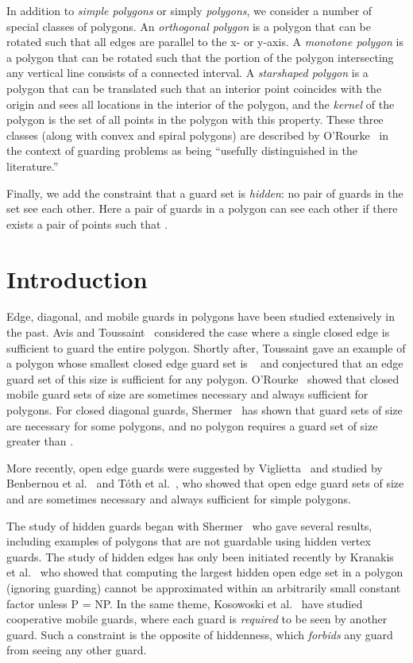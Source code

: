 \documentclass{cccg12}
\begin{document}
In addition to \emph{simple polygons} or simply \emph{polygons}, we consider a number of special classes of polygons.
An \emph{orthogonal polygon} is a polygon that can be rotated such that all edges are parallel to the x- or y-axis.
A \emph{monotone polygon} is a polygon that can be rotated such that the portion of the polygon intersecting any vertical line consists of a connected interval.
A \emph{starshaped polygon} is a polygon that can be translated such that an interior point coincides with the origin and sees all locations in the interior of the polygon, and the \emph{kernel} of the polygon is the set of all points in the polygon with this property.
These three classes (along with convex and spiral polygons) are described by O'Rourke~\cite{ORourke-1987} in the context of guarding problems as being ``usefully distinguished in the literature.''

Finally, we add the constraint that a guard set is \emph{hidden}: no pair of guards in the set see each other.
Here a pair of guards  in a polygon  can see each other if there exists a pair of points  such that .

\section{Introduction}

Edge, diagonal, and mobile guards in polygons have been studied extensively in the past.
Avis and Toussaint~\cite{Avis-1981} considered the case where a single closed edge is sufficient to guard the entire polygon.
Shortly after, Toussaint gave an example of a polygon whose smallest closed edge guard set is ~\cite{ORourke-1983} and conjectured that an edge guard set of this size is sufficient for any polygon.
O'Rourke~\cite{ORourke-1983} showed that closed mobile guard sets of size  are sometimes necessary and always sufficient for polygons.
For closed diagonal guards, Shermer~\cite{Shermer-1992} has shown that guard sets of size  are necessary for some polygons, and no polygon requires a guard set of size greater than .

More recently, open edge guards were suggested by Viglietta~\cite{Viglietta-2011} and studied by Benbernou et al.~\cite{Benbernou-2011} and T\'{o}th et al.~\cite{Toth-2011}, who showed that open edge guard sets of size  and  are sometimes necessary and always sufficient for simple polygons. 

The study of hidden guards began with Shermer~\cite{Shermer-1989} who gave several results, including examples of polygons that are not guardable using hidden vertex guards.
The study of hidden edges has only been initiated recently by Kranakis et al.~\cite{Kranakis-2009} who showed that computing the largest hidden open edge set in a polygon (ignoring guarding) cannot be approximated within an arbitrarily small constant factor unless P = NP. 
In the same theme, Kosowoski et al.~\cite{Kosowski-2006} have studied cooperative mobile guards, where each guard is \emph{required} to be seen by another guard.
Such a constraint is the opposite of hiddenness, which \emph{forbids} any guard from seeing any other guard. 
\end{document}
